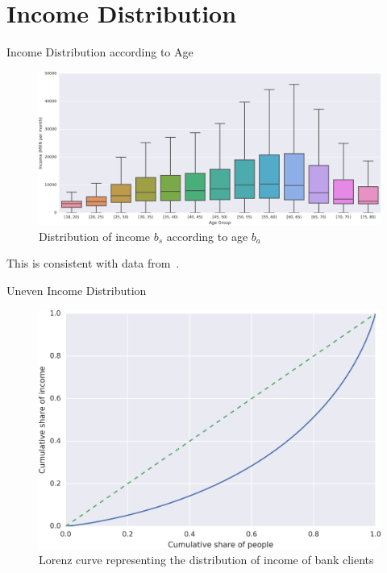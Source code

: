 \documentclass{beamer}
\begin{document}
\section{Income Distribution}

\begin{frame}{Income Distribution according to Age}

\begin{figure}
\begin{center}
\includegraphics[width=\columnwidth]{income_age_boxplot4_wide.png}
\caption{Distribution of income $b_s$ according to age $b_a$}
\label{income_age_boxplot}
\end{center}
\end{figure}
This is consistent with data from~\cite{gallup2013}.

\end{frame}




\begin{frame}{Uneven Income Distribution}

\begin{figure}
\begin{center}
\includegraphics[width=0.8\columnwidth]{cumulative_income.png}
\caption{Lorenz curve representing the distribution of income of bank clients}
\label{fig:income_distribution}
\end{center}
\end{figure}

\end{frame}
\end{document}
